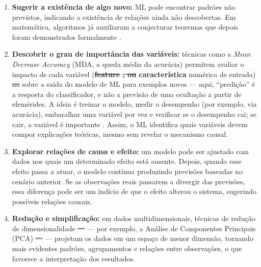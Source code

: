 \documentclass[msc]{on} %
\makeatletter
\providecommand{\DIFaddtex}[1]{{\protect\color{red}#1}} %
\providecommand{\DIFdeltex}[1]{{\protect\color{red}\sout{#1}}} %
\providecommand{\DIFaddbegin}{} %
\providecommand{\DIFaddend}{} %
\providecommand{\DIFdelbegin}{} %
\providecommand{\DIFdelend}{} %
\providecommand{\DIFadd}[1]{\texorpdfstring{\DIFaddtex{#1}}{#1}} %
\providecommand{\DIFdel}[1]{\texorpdfstring{\DIFdeltex{#1}}{}} %
\let\sout@orig\sout %
\renewcommand{\sout}[1]{\ifmmode\text{\sout@orig{\ensuremath{#1}}}\else\sout@orig{#1}\fi} %
\makeatother
\begin{document}
\DIFaddbegin \begin{enumerate}
	\item[\DIFadd{(i)}] \DIFaddend \textbf{Sugerir a existência de algo novo:} ML pode encontrar padrões não previstos, indicando a existência de relações ainda não descobertas. Em matemática, algoritmos já auxiliaram a conjecturar teoremas que depois foram demonstrados formalmente \citep{gryak2018conjugacy}.

	\DIFaddbegin \item[\DIFadd{(ii)}] \DIFaddend \textbf{Descobrir o grau de importância das variáveis:} técnicas como \DIFaddbegin \DIFadd{a }\DIFaddend \textit{Mean Decrease Accuracy} (MDA\DIFaddbegin \DIFadd{, a queda média da acurácia}\DIFaddend ) permitem avaliar o impacto de cada variável (\textbf{\DIFdelbegin \DIFdel{feature}%
\DIFdel{, ou }\DIFdelend característica\DIFaddbegin } \DIFaddend numérica de entrada) \DIFdelbegin \DIFdel{na }\DIFdelend\ifhmode\hskip0pt\fi \DIFaddbegin \DIFadd{sobre a saída do modelo de ML para exemplos novos --- aqui, ``}\DIFaddend predição\DIFaddbegin \DIFadd{'' é a resposta do classificador, e não a previsão de uma ocultação a partir de efemérides}\DIFaddend . A ideia é treinar o modelo, medir o desempenho (por exemplo, via acurácia), embaralhar uma variável por vez e verificar se o desempenho cai; se cair, a variável é importante \citep{liu2004comparative}. Assim, o ML identifica quais variáveis devem compor explicações teóricas, mesmo sem revelar o mecanismo causal.

	\DIFaddbegin \item[\DIFadd{(iii)}] \DIFaddend \textbf{Explorar relações de causa e efeito:} um modelo pode ser ajustado com dados nos quais um determinado efeito está ausente. Depois, quando esse efeito passa a atuar, o modelo continua produzindo previsões baseadas no cenário anterior. Se as observações reais passarem a divergir das previsões, essa diferença pode ser um indício de que o efeito alterou o sistema, sugerindo possíveis relações causais.

	\DIFaddbegin \item[\DIFadd{(iv)}] \DIFaddend \textbf{Redução e simplificação:} em dados multidimensionais, técnicas de redução de dimensionalidade \DIFdelbegin \DIFdel{— }\DIFdelend\ifhmode\hskip0pt\fi \DIFaddbegin \DIFadd{--- }\DIFaddend por exemplo, a Análise de Componentes Principais (PCA) \DIFdelbegin \DIFdel{— }\DIFdelend\ifhmode\hskip0pt\fi \DIFaddbegin \DIFadd{--- }\DIFaddend projetam os dados em um espaço de menor dimensão, tornando mais evidentes padrões, agrupamentos e relações entre observações, o que favorece a interpretação dos resultados.


\end{enumerate}
\end{document}
